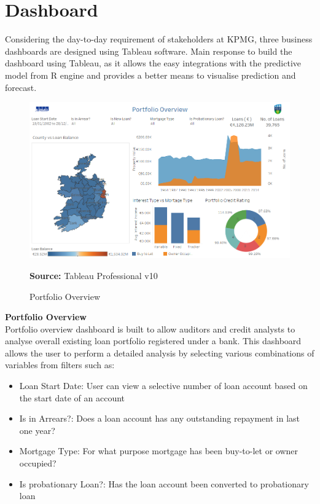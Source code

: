\section{Dashboard}
Considering the day-to-day requirement of stakeholders at KPMG, three business dashboards are designed using Tableau software. Main response to build the dashboard using Tableau, as it allows the easy integrations with the predictive model from R engine and provides a better means to visualise prediction and forecast.

\begin{center}
\begin{figure}[!htb]
\includegraphics[width=\textwidth]{Overview.png}
\centering
\caption{Portfolio Overview}{\textbf{Source:} Tableau Professional v10}
\label{fig:overview}
\end{figure}
\end{center}


\textbf{Portfolio Overview}\\
Portfolio overview dashboard is built to allow auditors and credit analysts to analyse overall existing loan portfolio registered under a bank. This dashboard allows the user to perform a detailed analysis by selecting various combinations of variables from filters such as:
\begin{itemize}
\item Loan Start Date: User can view a selective number of loan account based on the start date of an account
\item Is in Arrears?: Does a loan account has any outstanding repayment in last one year?
\item Mortgage Type: For what purpose mortgage has been buy-to-let or owner occupied?
\item Is probationary Loan?: Has the loan account been converted to probationary loan
\end{itemize}

